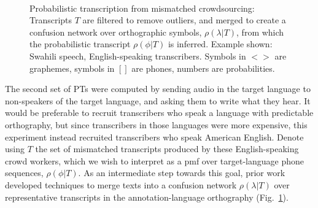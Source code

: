 \begin{figure}[b!]
\begin{center}
\\
\end{center}
\setlength{\abovecaptionskip}{0pt}
\caption{Probabilistic transcription from mismatched crowdsourcing:
  Transcripts $T$ are filtered to remove outliers, and merged to
  create a confusion network over orthographic symbols,
  $\rho(\lambda|T)$, from which the probabilistic transcript
  $\rho(\phi|T)$ is inferred. Example shown: Swahili speech,
  English-speaking transcribers.  Symbols in $<$$>$ are graphemes,
  symbols in $[]$ are phones, numbers are probabilities.}
\label{fig:mcmethods}
\end{figure}

The second set of PTs were computed by sending audio in the target
language to non-speakers of the target language, and asking them to
write what they hear.  It would be preferable to recruit transcribers
who speak a language with predictable orthography, but since
transcribers in those languages were more expensive, this
experiment instead recruited transcribers who speak American English.
Denote using $T$ the set of mismatched
transcripts produced by these English-speaking crowd workers,
which we wish to interpret as a pmf over
target-language phone sequences, $\rho(\phi|T)$.  As an intermediate
step towards this goal, prior work~\cite{JHJ15b} developed techniques
to merge texts into a confusion network
$\rho(\lambda|T)$ over representative transcripts in the
annotation-language orthography (Fig.~\ref{fig:mcmethods}).

